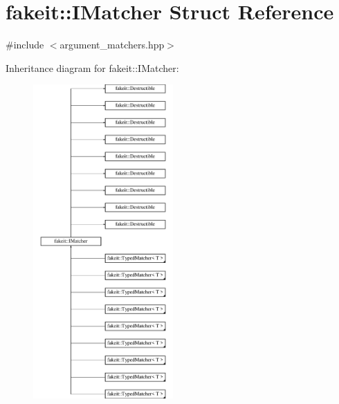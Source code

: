 \hypertarget{structfakeit_1_1IMatcher}{}\section{fakeit\+::I\+Matcher Struct Reference}
\label{structfakeit_1_1IMatcher}


{\ttfamily \#include $<$argument\+\_\+matchers.\+hpp$>$}

Inheritance diagram for fakeit\+::I\+Matcher\+:\begin{figure}[H]
\begin{center}
\leavevmode
\includegraphics[height=12.000000cm]{structfakeit_1_1IMatcher}
\end{center}
\end{figure}
